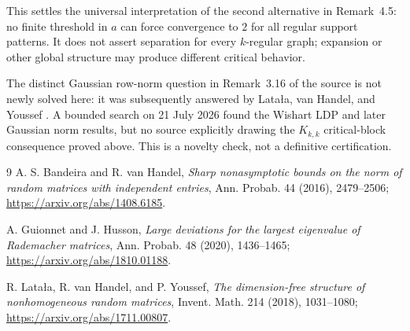\documentclass[11pt]{article}
\begin{document}
This settles the universal interpretation of the second alternative in
Remark~4.5: no finite threshold in $a$ can force convergence to $2$ for all
regular support patterns.  It does not assert separation for every
$k$-regular graph; expansion or other global structure may produce different
critical behavior.

The distinct Gaussian row-norm question in Remark~3.16 of the source is not
newly solved here: it was subsequently answered by Lata\l a, van Handel, and
Youssef \cite{LvHY}.  A bounded search on 21 July 2026 found the Wishart LDP
and later Gaussian norm results, but no source explicitly drawing the
$K_{k,k}$ critical-block consequence proved above.  This is a novelty check,
not a definitive certification.

\begin{thebibliography}{9}
A. S. Bandeira and R. van Handel,
\emph{Sharp nonasymptotic bounds on the norm of random matrices with
independent entries}, Ann. Probab. 44 (2016), 2479--2506;
\url{https://arxiv.org/abs/1408.6185}.

A. Guionnet and J. Husson,
\emph{Large deviations for the largest eigenvalue of Rademacher matrices},
Ann. Probab. 48 (2020), 1436--1465;
\url{https://arxiv.org/abs/1810.01188}.

R. Lata\l a, R. van Handel, and P. Youssef,
\emph{The dimension-free structure of nonhomogeneous random matrices},
Invent. Math. 214 (2018), 1031--1080;
\url{https://arxiv.org/abs/1711.00807}.
\end{thebibliography}
\end{document}
